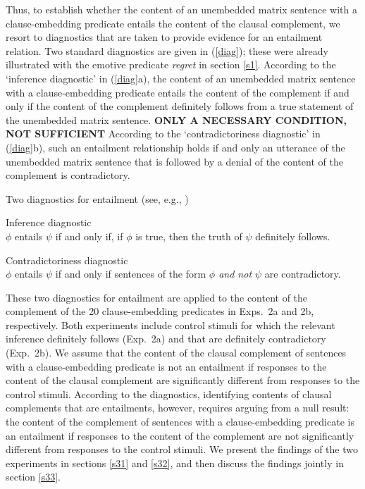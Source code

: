\documentclass[11pt,fleqn]{article}
\newcommand{\6}{\mbox{$[\hspace*{-.6mm}[$}}
\newcommand{\9}{\mbox{$]\hspace*{-.6mm}]$}}
\begin{document}
Thus, to establish whether the content of an unembedded matrix sentence with a clause-embedding predicate entails the content of the clausal complement, we resort to diagnostics that are taken to provide evidence for an entailment relation. Two standard diagnostics are given in (\ref{diag}); these were already illustrated with the emotive predicate {\em regret} in section \ref{s1}. According to the `inference diagnostic' in (\ref{diag}a), the content of an unembedded matrix sentence with a clause-embedding predicate entails the content of the complement if and only if the content of the complement definitely follows from a true statement of the unembedded matrix sentence. {\bf  ONLY A NECESSARY CONDITION, NOT SUFFICIENT} According to the `contradictoriness diagnostic' in (\ref{diag}b), such an entailment relationship holds if and only an utterance of the unembedded matrix sentence that is followed by a denial of the content of the complement is contradictory. 

\begin{exe}
\ex\label{diag} Two diagnostics for entailment \hfill (see, e.g., \citealt[\S3.1]{ccmg90})
\begin{xlist}
\ex  Inference diagnostic \\ $\phi$ entails $\psi$ if and only if, if $\phi$ is true, then the truth of $\psi$ definitely follows. 

\ex  Contradictoriness diagnostic \\ $\phi$ entails $\psi$ if and only if sentences of the form {\em $\phi$ and not $\psi$} are contradictory. 

\end{xlist}
\end{exe}
These two diagnostics for entailment are applied to the content of the complement of the 20 clause-embedding predicates in Exps.~2a and 2b, respectively. Both experiments include control stimuli for which the relevant inference definitely follows (Exp.~2a) and that are definitely contradictory (Exp.~2b). We assume that the content of the clausal complement of sentences with a clause-embedding predicate is not an entailment if responses to the content of the clausal complement are significantly different from responses to the control stimuli. According to the diagnostics, identifying contents of clausal complements that are entailments, however, requires arguing from a null result: the content of the complement of sentences with a clause-embedding predicate is an entailment if responses to the content of the complement are not significantly different from responses to the control stimuli. We present the findings of the two experiments in sections \ref{s31} and \ref{s32}, and then discuss the findings jointly in section \ref{s33}.
\end{document}
